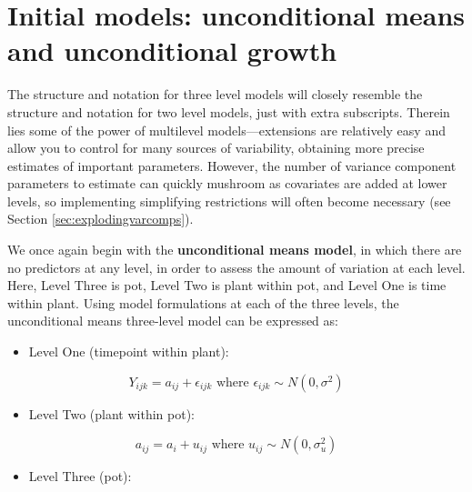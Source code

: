 \documentclass[
]{krantz}
\providecommand{\tightlist}{%
  \setlength{\itemsep}{0pt}\setlength{\parskip}{0pt}}
\begin{document}
\hypertarget{initialmodels-3level}{%
\section{Initial models: unconditional means and unconditional growth}\label{initialmodels-3level}}

The structure and notation for three level models will closely resemble the structure and notation for two level models, just with extra subscripts. Therein lies some of the power of multilevel models---extensions are relatively easy and allow you to control for many sources of variability, obtaining more precise estimates of important parameters. However, the number of variance component parameters to estimate can quickly mushroom as covariates are added at lower levels, so implementing simplifying restrictions will often become necessary (see Section \ref{sec:explodingvarcomps}).

We once again begin with the \textbf{unconditional means model}, in which there are no predictors at any level, in order to assess the amount of variation at each level. Here, Level Three is pot, Level Two is plant within pot, and Level One is time within plant. Using model formulations at each of the three levels, the unconditional means three-level model can be expressed as:

\begin{itemize}
\tightlist
\item
  Level One (timepoint within plant):
\end{itemize}

\begin{equation}
Y_{ijk} = a_{ij}+\epsilon_{ijk} \textrm{ where } \epsilon_{ijk}\sim N(0,\sigma^2)
\label{eq:initunun}
\end{equation}

\begin{itemize}
\tightlist
\item
  Level Two (plant within pot):
\end{itemize}

\begin{equation}
a_{ij} = a_{i}+u_{ij} \textrm{ where } u_{ij}\sim N(0,\sigma_{u}^{2})
\label{eq:initunun2}
\end{equation}

\begin{itemize}
\tightlist
\item
  Level Three (pot):
\end{itemize}
\end{document}
